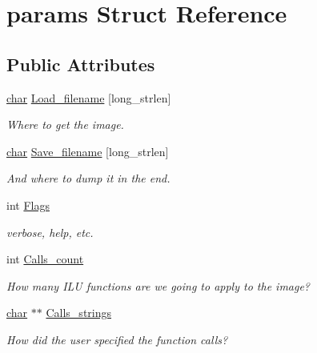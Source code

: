 \hypertarget{structparams}{}\section{params Struct Reference}
\label{structparams}
\subsection*{Public Attributes}
\begin{DoxyCompactItemize}
\item 
\mbox{\label{structparams_a3c4247cbeaf86aa088dadb789a51b9ae}} 
\hyperlink{classchar}{char} \hyperlink{structparams_a3c4247cbeaf86aa088dadb789a51b9ae}{Load\+\_\+filename} \mbox{[}long\+\_\+strlen\mbox{]}
\begin{DoxyCompactList}\small\item\em Where to get the image. \end{DoxyCompactList}\item 
\mbox{\label{structparams_a91d52a48992ad7266ea9529c6958b63c}} 
\hyperlink{classchar}{char} \hyperlink{structparams_a91d52a48992ad7266ea9529c6958b63c}{Save\+\_\+filename} \mbox{[}long\+\_\+strlen\mbox{]}
\begin{DoxyCompactList}\small\item\em And where to dump it in the end. \end{DoxyCompactList}\item 
\mbox{\label{structparams_aa2d6c2e17c6e9fe4377451a7378f276d}} 
int \hyperlink{structparams_aa2d6c2e17c6e9fe4377451a7378f276d}{Flags}
\begin{DoxyCompactList}\small\item\em verbose, help, etc. \end{DoxyCompactList}\item 
\mbox{\label{structparams_a8ad607a3908fc21071ce0de2fbb77e91}} 
int \hyperlink{structparams_a8ad607a3908fc21071ce0de2fbb77e91}{Calls\+\_\+count}
\begin{DoxyCompactList}\small\item\em How many I\+LU functions are we going to apply to the image? \end{DoxyCompactList}\item 
\mbox{\label{structparams_a49f54a1a7ff00f127e7c855478771422}} 
\hyperlink{classchar}{char} $\ast$$\ast$ \hyperlink{structparams_a49f54a1a7ff00f127e7c855478771422}{Calls\+\_\+strings}
\begin{DoxyCompactList}\small\item\em How did the user specified the function calls? \end{DoxyCompactList}\end{DoxyCompactItemize}


